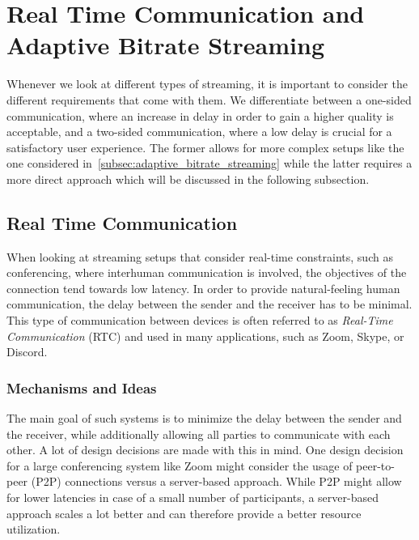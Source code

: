 \section{Real Time Communication and Adaptive Bitrate Streaming}\label{sec:rt_and_adaptive_bitrate_streaming}

Whenever we look at different types of streaming, it is important to consider the 
different requirements that come with them.
We differentiate between a one-sided communication, where an increase in delay 
in order to gain a higher quality is acceptable, and a two-sided communication, 
where a low delay is crucial for a satisfactory user experience.
The former allows for more complex setups like the one considered 
in~\autoref{subsec:adaptive_bitrate_streaming} while the latter requires
a more direct approach which will be discussed in the following subsection.

\subsection{Real Time Communication}
When looking at streaming setups that consider real-time constraints, such as conferencing, 
where interhuman communication is involved, the objectives of the connection tend towards
low latency.
In order to provide natural-feeling human communication, the delay between the sender 
and the receiver has to be minimal.
This type of communication between devices is often referred to as \textit{Real-Time Communication} 
(RTC) and used in many applications, such as Zoom, Skype, or Discord.

\subsubsection{Mechanisms and Ideas}
The main goal of such systems is to minimize the delay between the sender and the receiver,
while additionally allowing all parties to communicate with each other.
A lot of design decisions are made with this in mind.
One design decision for a large conferencing system like Zoom
might consider the usage of peer-to-peer (P2P) connections versus a server-based
approach.
While P2P might allow for lower latencies in case of a small number of participants,
a server-based approach scales a lot better and can therefore provide a better
resource utilization.

